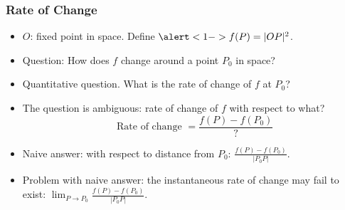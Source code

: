 \begin{frame}
\frametitle{Rate of Change}
\begin{itemize}
\item $O$: fixed point in space. Define $\alert<1->{f(P) = |OP|^2}$.
\item<2-> Question: How does $f$ change around a point $P_0$ in space? 
\item<4->\alert<1->{Quantitative} question. What is the \alert<1->{rate of change} of $f$ at $P_0$?
\item<5-> The question is ambiguous: rate of change of $f$ with respect to what?
$$\text{ Rate of change } = \frac{f(P) - f(P_0)}{\textbf{?}}$$
\item<6-> Naive answer: with respect to \alert<1->{distance} from $P_0$:
$\frac{f(P) - f(P_0)}{|P_0P|}$.
\item<7-> Problem with naive answer: \alert<1->{the instantaneous rate of change may fail to exist:} $\lim_{P\to P_0} \frac{f(P)-f(P_0)}{|P_0P|}$.
\end{itemize}
\end{frame}